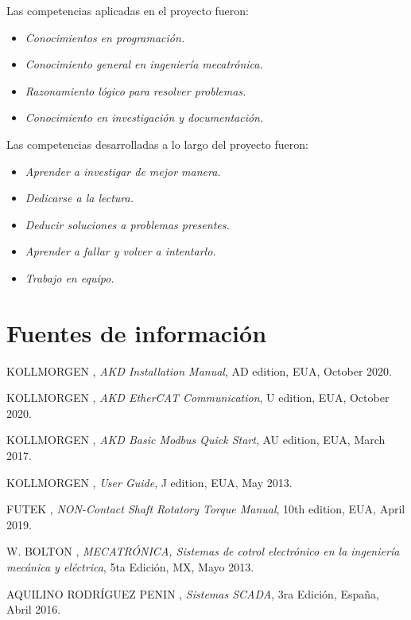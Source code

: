 \documentclass[12pt,titlepage]{article}
\begin{document}
Las competencias aplicadas en el proyecto fueron: \\
\begin{itemize}
\item \textit{Conocimientos en programación.}
\item \textit{Conocimiento general en ingeniería mecatrónica.} 
\item \textit{Razonamiento lógico para resolver problemas.}
\item \textit{Conocimiento en investigación y documentación.}
\end{itemize}
\vspace{1.8cm}
Las competencias desarrolladas a lo largo del proyecto fueron: \\
\begin{itemize}
\item \textit{Aprender a investigar de mejor manera.} 
\item \textit{Dedicarse a la lectura.}
\item \textit{Deducir soluciones a problemas presentes.} 
\item \textit{Aprender a fallar y volver a intentarlo.} 
\item \textit{Trabajo en equipo.}
\end{itemize}
\newpage
\section{Fuentes de información}
\begin{thebibliography}{X}
 \textsc{KOLLMORGEN} ,
\textit{AKD Installation Manual}, AD edition,
EUA, October 2020.

 \textsc{KOLLMORGEN} ,
\textit{AKD EtherCAT Communication}, U edition,
EUA, October 2020.

 \textsc{KOLLMORGEN} ,
\textit{AKD Basic Modbus Quick Start}, AU edition,
EUA, March 2017.

 \textsc{KOLLMORGEN} ,
\textit{User Guide}, J edition,
EUA, May 2013.

 \textsc{FUTEK} ,
\textit{NON-Contact Shaft Rotatory Torque Manual}, 10th edition,
EUA, April 2019.


 \textsc{W. BOLTON} ,
\textit{MECATRÓNICA, Sistemas de cotrol electrónico en la ingeniería mecánica y eléctrica}, 5ta Edición,
MX, Mayo 2013.

 \textsc{AQUILINO RODRÍGUEZ PENIN} ,
\textit{Sistemas SCADA}, 3ra Edición,
España, Abril 2016.

\end{thebibliography}

\newpage %
{
  \hypersetup{hidelinks}
\listoffigures %
}
\newpage
{
  \hypersetup{hidelinks}
\listoftables %
}
\end{document}

